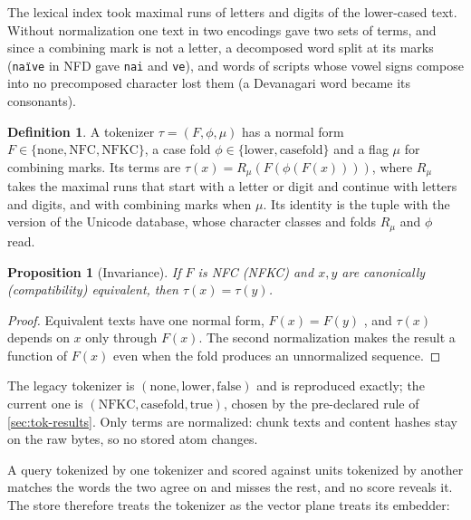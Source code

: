 \documentclass[11pt]{article}
\theoremstyle{plain}
\newtheorem{proposition}{Proposition}
\theoremstyle{definition}
\newtheorem{definition}{Definition}
\theoremstyle{remark}
\newcommand{\code}[1]{\texttt{#1}}
\begin{document}
The lexical index took maximal runs of letters and digits of the lower-cased text. Without
normalization one text in two encodings gave two sets of terms, and since a combining mark is not
a letter, a decomposed word split at its marks (\code{na\"{\i}ve} in NFD gave \code{nai} and
\code{ve}), and words of scripts whose vowel signs compose into no precomposed character lost
them (a Devanagari word became its consonants).

\begin{definition}
A tokenizer $\tau = (F, \phi, \mu)$ has a normal form $F \in \{\text{none}, \text{NFC},
\text{NFKC}\}$, a case fold $\phi \in \{\text{lower}, \text{casefold}\}$ and a flag $\mu$ for
combining marks. Its terms are $\tau(x) = R_\mu(F(\phi(F(x))))$, where $R_\mu$ takes the maximal
runs that start with a letter or digit and continue with letters and digits, and with combining
marks when $\mu$. Its identity is the tuple with the version of the Unicode database, whose
character classes and folds $R_\mu$ and $\phi$ read.
\end{definition}

\begin{proposition}[Invariance]\label{prop:invariance}
If $F$ is NFC (NFKC) and $x, y$ are canonically (compatibility) equivalent, then $\tau(x) =
\tau(y)$.
\end{proposition}

\begin{proof}
Equivalent texts have one normal form, $F(x) = F(y)$ \citep{uax15}, and $\tau(x)$ depends on $x$
only through $F(x)$. The second normalization makes the result a function of $F(x)$ even when the
fold produces an unnormalized sequence.
\end{proof}

The legacy tokenizer is $(\text{none}, \text{lower}, \text{false})$ and is reproduced exactly; the
current one is $(\text{NFKC}, \text{casefold}, \text{true})$, chosen by the pre-declared rule of
\cref{sec:tok-results}. Only terms are normalized: chunk texts and content hashes stay on the raw
bytes, so no stored atom changes.

A query tokenized by one tokenizer and scored against units tokenized by another matches the
words the two agree on and misses the rest, and no score reveals it. The store therefore treats
the tokenizer as the vector plane treats its embedder:
\end{document}
